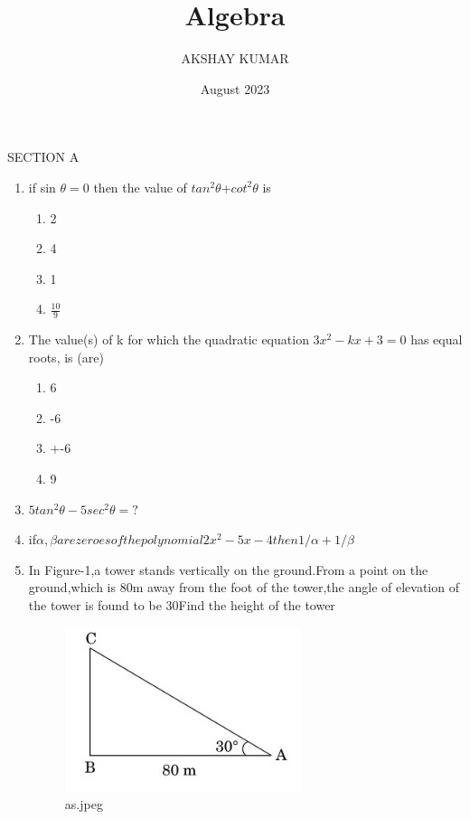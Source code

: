 \documentclass{article}
\title{Algebra }
\author{AKSHAY KUMAR}
\date{August 2023}
\begin{document}
\maketitle

                     {SECTION A}
\begin{enumerate}
    \item if sin $\theta=0$ then the value of $tan^2\theta$+$cot^2\theta$ is
    \begin{enumerate}
        \item 2  \item 4
        \item 1
        \item $\frac{10}{9}$
    \end{enumerate}
    \item The value(s) of k for which the quadratic equation $3x^2-kx+3=0$ has
equal roots, is (are) 
\begin{enumerate}
    \item 6 
    \item -6
    \item +-6
    \item 9
\end{enumerate}
\item $5tan^2 \theta-5sec^2\theta=?$
 \item if$\alpha,\beta are zeroes of the polynomial 2x^2-5x-4 then 1/\alpha+1/\beta$
     \item In Figure-1,a tower stands vertically on the ground.From a point on the ground,which is 80m away from the foot of the tower,the angle of elevation of the tower is found to be 30\degree Find the height of the tower
\begin{figure}[htbp]
    \centering
	\includegraphics[width=\columnwidth]{as.jpeg}
    \caption{as.jpeg}
    \label{fig:example}
\end{figure}


\end{enumerate}
\end{document}
